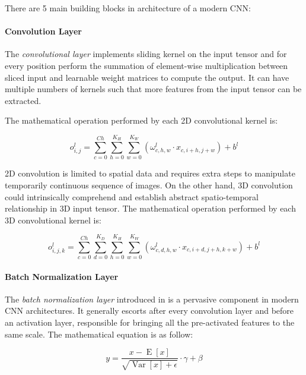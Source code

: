        There are 5 main building blocks in architecture of a modern CNN:

        \paragraph{Convolution Layer}
            The \textit{convolutional layer} implements sliding kernel on the input tensor and for every position perform the summation of element-wise multiplication between sliced input and learnable weight matrices to compute the output.
            It can have multiple numbers of kernels such that more features from the input tensor can be extracted.

            The mathematical operation performed by each 2D convolutional kernel is:

            \begin{equation}
                o_{i,j}^l = \sum_{c=0}^{Ch}\sum_{h=0}^{K_H}\sum_{w=0}^{K_W}\left(\omega_{c,h,w}^l \cdot x_{c,i+h,j+w}\right) + b^l
            \end{equation}

            2D convolution is limited to spatial data and requires extra steps to manipulate temporarily continuous sequence of images.
            On the other hand, 3D convolution could intrinsically comprehend and establish abstract spatio-temporal relationship in 3D input tensor.
            The mathematical operation performed by each 3D convolutional kernel is:

            \begin{equation}
                o_{i,j,k}^l = \sum_{c=0}^{Ch}\sum_{d=0}^{K_D}\sum_{h=0}^{K_H}\sum_{w=0}^{K_W}\left(\omega_{c,d,h,w}^l \cdot x_{c,i+d,j+h,k+w}\right) + b^l
            \end{equation}

        \paragraph{Batch Normalization Layer}
            The \textit{batch normalization layer} introduced in \cite{ioffe2015batchnorm} is a pervasive component in modern CNN architectures.
            It generally escorts after every convolution layer and before an activation layer, responsible for bringing all the pre-activated features to the same scale.
            The mathematical equation is as follow:

            \begin{equation}
                y = \frac{x - \operatorname{E}[x]}{\sqrt{\operatorname{Var}[x] + \epsilon}} \cdot \gamma + \beta
            \end{equation}


